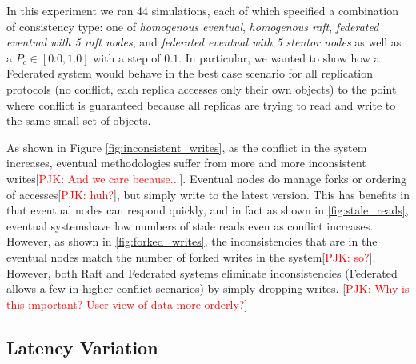 \documentclass[10pt,conference,letterpaper]{IEEEtran}
\newcommand{\todo}[1]{{\textcolor{red}{#1}}}
\newcommand{\pjk}[1]{[\todo{PJK: #1}]}
\begin{document}
In this experiment we ran 44 simulations, each of which specified a combination of consistency type: one of \textit{homogenous eventual}, \textit{homogenous raft}, \textit{federated eventual with 5 raft nodes}, and \textit{federated eventual with 5 stentor nodes} as well as a $P_c \in [0.0,1.0]$ with a step of $0.1$. In particular, we wanted to show how a Federated system would behave in the best case scenario for all replication protocols (no conflict, each replica accesses only their own objects) to the point where conflict is guaranteed because all replicas are trying to read and write to the same small set of objects.

As shown in Figure \ref{fig:inconsistent_writes}, as the conflict in the system increases, eventual methodologies suffer from more and more inconsistent writes\pjk{And we care because...}. Eventual nodes do manage forks or ordering of accesses\pjk{huh?}, but simply write to the latest version. This has benefits in that eventual nodes can respond quickly, and in fact as shown in \ref{fig:stale_reads}, eventual systemshave low numbers of stale reads even as conflict increases. However, as shown in \ref{fig:forked_writes}, the inconsistencies that are in the eventual nodes match the number of forked writes in the system\pjk{so?}. However, both Raft and Federated systems eliminate inconsistencies (Federated allows a few in higher conflict scenarios) by simply dropping writes. \pjk{Why is this important? User view of data more orderly?}

\subsection{Latency Variation}
\end{document}
